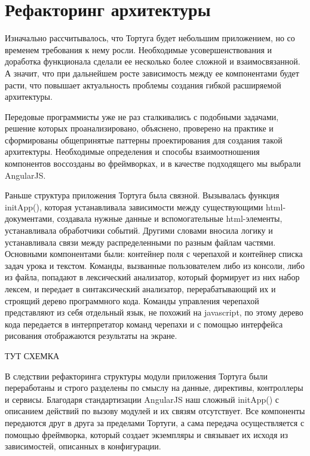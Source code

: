 \section{Рефакторинг архитектуры} \label{sect1_1}
Изначально рассчитывалось, что Тортуга будет небольшим приложением, но со временем требования к нему росли. Необходимые усовершенствования и доработка функционала сделали ее несколько более сложной и взаимосвязанной. А значит, что при дальнейшем росте зависимость между ее компонентами будет расти, что повышает актуальность проблемы создания гибкой расширяемой архитектуры. 

Передовые программисты уже не раз сталкивались с подобными задачами, решение которых проанализировано, объяснено, проверено на практике и сформированы общепринятые паттерны проектирования для создания такой архитектуры. Необходимые определения и способы взаимоотношения компонентов воссозданы во фреймворках, и в качестве подходящего мы выбрали AngularJS.

Раньше структура приложения Тортуга была связной. Вызывалась функция initApp(), которая устанавливала зависимости между существующими html-документами, создавала нужные данные и вспомогательные html-элементы, устанавливала обработчики событий. Другими словами вносила логику и устанавливала связи между распределенными по разным файлам частями. Основными компонентами были: контейнер поля с черепахой и контейнер списка задач урока и текстом. Команды, вызванные пользователем либо из консоли, либо из файла, попадают в лексический анализатор, который формирует из них набор лексем, и передает в синтаксический анализатор, перерабатывающий их и строящий дерево программного кода. Команды управления черепахой представляют из себя отдельный язык, не похожий на javascript, по этому дерево кода передается в интерпретатор команд черепахи и с помощью интерфейса рисования отображаются результаты на экране.

\vspace{6mm}
ТУТ СХЕМКА
\vspace{6mm}

В следствии рефакторинга структуры модули приложения Тортуга были переработаны и строго разделены по смыслу на данные, директивы, контроллеры и сервисы. Благодаря стандартизации AngularJS наш сложный initApp() с описанием действий по вызову модулей  и их связям отсутствует. Все компоненты передаются друг в друга за пределами Тортуги, а сама передача осуществляется с помощью фреймворка, который создает экземпляры и связывает их исходя из зависимостей, описанных в конфигурации.

